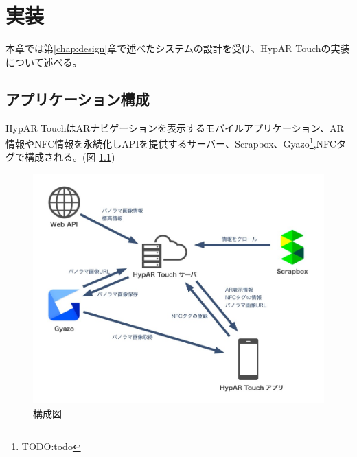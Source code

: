 \chapter{実装}
\label{chap:implementation}

本章では第\ref{chap:design}章で述べたシステムの設計を受け、HypAR Touchの実装について述べる。

\newpage

\section{アプリケーション構成}
HypAR TouchはARナビゲーションを表示するモバイルアプリケーション、AR情報やNFC情報を永続化しAPIを提供するサーバー、Scrapbox、Gyazo\footnote{\textsf{TODO:todo}},NFCタグで構成される。(図 \ref{fig:application_structure})

\begin{figure}[h]
  \centering
  \includegraphics[width=150mm]{images/application_structure.jpg}
  \caption{構成図} \label{fig:application_structure}
\end{figure}

